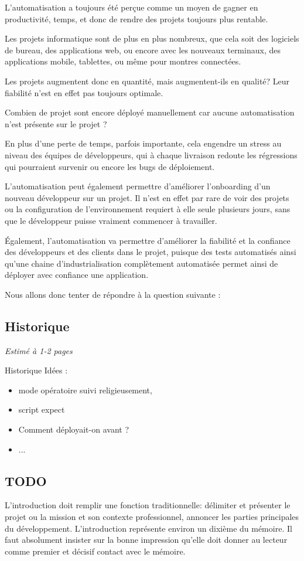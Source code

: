 
L'automatisation a toujours été perçue comme un moyen de gagner en productivité, temps, et donc de rendre des projets toujours plus rentable.
	
Les projets informatique sont de plus en plus nombreux, que cela soit des logiciels de bureau, des applications web, ou encore avec les nouveaux terminaux, des applications mobile, tablettes, ou même pour montres connectées.
	
Les projets augmentent donc en quantité, mais augmentent-ils en qualité? Leur fiabilité n'est en effet pas toujours optimale. 
	
Combien de projet sont encore déployé manuellement car aucune automatisation n'est présente sur le projet ? 
	
En plus d'une perte de temps, parfois importante, cela engendre un stress au niveau des équipes de développeurs, qui à chaque livraison redoute les régressions qui pourraient survenir ou encore les bugs de déploiement.

L'automatisation peut également permettre d'améliorer l'onboarding d'un nouveau développeur sur un projet. Il n'est en effet par rare de voir des projets ou la configuration de l'environnement requiert à elle seule plusieurs jours, sans que le développeur puisse vraiment commencer à travailler.
	
Également, l'automatisation va permettre d'améliorer la fiabilité et la confiance des développeurs et des clients dans le projet, puisque des tests automatisés ainsi qu'une chaine d'industrialisation complètement automatisée permet ainsi de déployer avec confiance une application.
	
Nous allons donc tenter de répondre à la question suivante : 
	
{\LARGE \problematique}
	
\subsection*{Historique}

\textit{Estimé à 1-2 pages}

Historique Idées : 
	
\begin{itemize}
	\item mode opératoire suivi religieusement, 
	\item script expect
	\item Comment déployait-on avant ?
	\item ...
\end{itemize}
	
\subsection*{TODO}
	
L’introduction doit remplir une fonction traditionnelle: délimiter et présenter le projet ou la mission et son contexte professionnel, annoncer les parties principales du développement. L’introduction représente environ un dixième du mémoire. Il faut absolument insister sur la bonne impression qu’elle doit donner au lecteur comme premier et décisif contact avec le mémoire.
